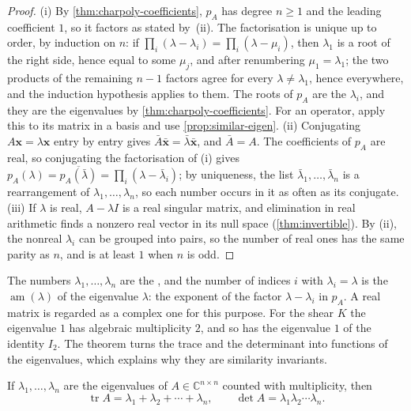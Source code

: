 \begin{proof}
(i) By \cref{thm:charpoly-coefficients}, $p_A$ has degree $n\ge1$ and the leading coefficient $1$, so it factors as stated by \,(ii). The factorisation is unique up to order, by induction on $n$: if $\prod_i(\lambda-\lambda_i)=\prod_i(\lambda-\mu_i)$, then $\lambda_1$ is a root of the right side, hence equal to some $\mu_j$, and after renumbering $\mu_1=\lambda_1$; the two products of the remaining $n-1$ factors agree for every $\lambda\ne\lambda_1$, hence everywhere, and the induction hypothesis applies to them. The roots of $p_A$ are the $\lambda_i$, and they are the eigenvalues by \cref{thm:charpoly-coefficients}. For an operator, apply this to its matrix in a basis and use \cref{prop:similar-eigen}. (ii) Conjugating $A\mathbf x=\lambda\mathbf x$ entry by entry gives $\bar A\bar{\mathbf x}=\bar\lambda\bar{\mathbf x}$, and $\bar A=A$. The coefficients of $p_A$ are real, so conjugating the factorisation of (i) gives $p_A(\lambda)=\overline{p_A(\bar\lambda)}=\prod_i(\lambda-\bar\lambda_i)$; by uniqueness, the list $\bar\lambda_1,\ldots,\bar\lambda_n$ is a rearrangement of $\lambda_1,\ldots,\lambda_n$, so each number occurs in it as often as its conjugate. (iii) If $\lambda$ is real, $A-\lambda I$ is a real singular matrix, and elimination in real arithmetic finds a nonzero real vector in its null space (\cref{thm:invertible}). By (ii), the nonreal $\lambda_i$ can be grouped into pairs, so the number of real ones has the same parity as $n$, and is at least $1$ when $n$ is odd.
\end{proof}

The numbers $\lambda_1,\ldots,\lambda_n$ are the , and the number of indices $i$ with $\lambda_i=\lambda$ is the  $\operatorname{am}(\lambda)$ of the eigenvalue $\lambda$: the exponent of the factor $\lambda-\lambda_i$ in $p_A$. A real matrix is regarded as a complex one for this purpose. For the shear $K$ the eigenvalue $1$ has algebraic multiplicity $2$, and so has the eigenvalue $1$ of the identity $I_2$. The theorem turns the trace and the determinant into functions of the eigenvalues, which explains why they are similarity invariants.

\begin{theorem}
\label{thm:trace-det-eigen}
If $\lambda_1,\ldots,\lambda_n$ are the eigenvalues of $A\in\mathbb C^{n\times n}$ counted with multiplicity, then
\[
\operatorname{tr}A=\lambda_1+\lambda_2+\cdots+\lambda_n,\qquad\det A=\lambda_1\lambda_2\cdots\lambda_n .
\]
\end{theorem}

